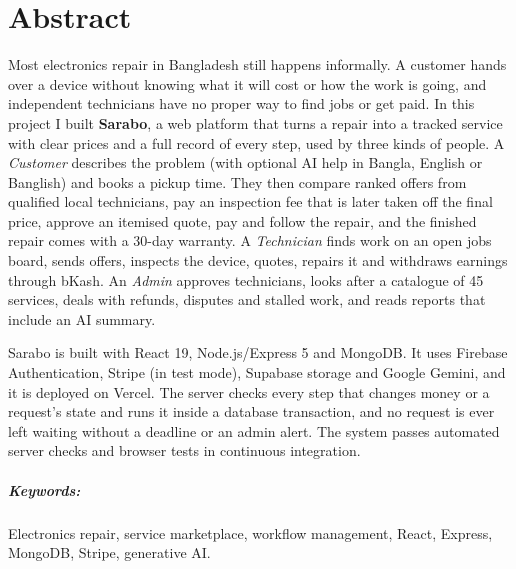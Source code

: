 \documentclass{standalone}
\begin{document}
\chapter*{Abstract}
Most electronics repair in Bangladesh still happens informally. A customer hands over a device without knowing what it will cost or how the work is going, and independent technicians have no proper way to find jobs or get paid. In this project I built \textbf{Sarabo}, a web platform that turns a repair into a tracked service with clear prices and a full record of every step, used by three kinds of people. A \emph{Customer} describes the problem (with optional AI help in Bangla, English or Banglish) and books a pickup time. They then compare ranked offers from qualified local technicians, pay an inspection fee that is later taken off the final price, approve an itemised quote, pay and follow the repair, and the finished repair comes with a 30-day warranty. A \emph{Technician} finds work on an open jobs board, sends offers, inspects the device, quotes, repairs it and withdraws earnings through bKash. An \emph{Admin} approves technicians, looks after a catalogue of 45 services, deals with refunds, disputes and stalled work, and reads reports that include an AI summary.

Sarabo is built with React 19, Node.js/Express 5 and MongoDB. It uses Firebase Authentication, Stripe (in test mode), Supabase storage and Google Gemini, and it is deployed on Vercel. The server checks every step that changes money or a request's state and runs it inside a database transaction, and no request is ever left waiting without a deadline or an admin alert. The system passes \servertestcount{} automated server checks and \clienttestcount{} browser tests in continuous integration.

\paragraph*{Keywords:} Electronics repair, service marketplace, workflow management, React, Express, MongoDB, Stripe, generative AI.
\end{document}

